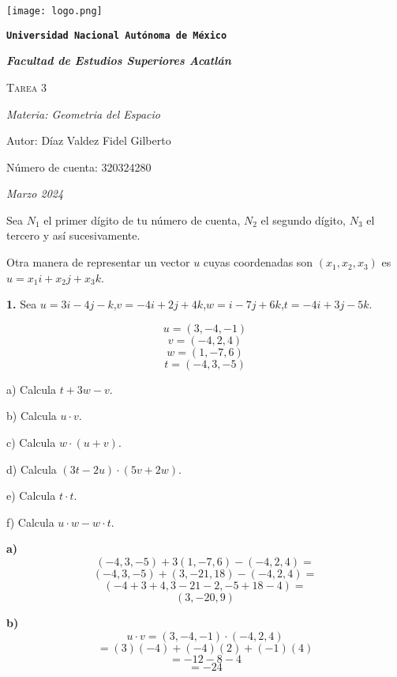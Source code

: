 \documentclass{article}
\begin{document}
\begin{titlepage}
    \centering    
    {\texttt{[image: logo.png]}\par}
    {\texttt{\bfseries \LARGE Universidad Nacional Autónoma de México} \par}
    \vspace{1cm}
    {\itshape \Large \bfseries Facultad de Estudios Superiores Acatlán \par}
    \vspace{3cm}
    {\scshape \Huge Tarea 3 \par}
    \vspace {3cm}
    {\slshape \Large Materia: Geometria del Espacio \par}
    \vspace{2cm}
    {\Large Autor: Díaz Valdez Fidel Gilberto\par}
    {\Large Número de cuenta: 320324280\par}
    \vfill
    {\itshape Marzo 2024 \par}
\end{titlepage}

Sea $N_1$ el primer dígito de tu número de cuenta, $N_2$ el segundo dígito, $N_3$ el tercero y así
sucesivamente.

Otra manera de representar un vector $u$ cuyas coordenadas son $(x_1, x_2, x_3)$ es $u = x_1i + x_2j + x_3k$.
\vspace*{10pt}

\textbf{1.} Sea $u=3i-4j-k$,$v=-4i+2j+4k$,$w=i-7j+6k$,$t=-4i+3j-5k.$

$$u = (3, -4, -1 )$$
$$v = (-4, 2, 4)$$
$$w = (1, -7, 6)$$
$$t = (-4, 3, -5 )$$

\begin{minipage}[c]{5cm}
    a) Calcula $t+3w-v$. 
    
    b) Calcula $u\cdot v$.

    c) Calcula $w\cdot(u+v)$.
\end{minipage}\hspace*{3cm}
\begin{minipage}[c]{5cm}
    d) Calcula $(3t-2u)\cdot(5v+2w)$.

    e) Calcula $t\cdot t$.

    f) Calcula $u\cdot w - w \cdot t$.
\end{minipage}
\vspace{10pt}

\begin{minipage}[c]{0.5cm}
    \textbf{a)}
    $$(-4, 3, -5 ) + 3(1, -7, 6)-(-4, 2, 4)=$$
    $$(-4, 3, -5 ) + (3, -21, 18) - (-4, 2, 4)=$$
    $$(-4 +3 +4 , 3 -21 -2 , -5 +18-4)=$$
    $$(3, -20, 9 )$$
\end{minipage}\hspace*{7cm}
\begin{minipage}[c]{0.5cm}
    \textbf{b)}
    $$u\cdot v = (3, -4, -1 )\cdot (-4, 2, 4)$$
    $$= (3)(-4)+(-4)(2)+(-1)(4)$$
    $$=-12-8-4$$
    $$= -24$$
\end{minipage}
\vspace{10pt}
\end{document}
